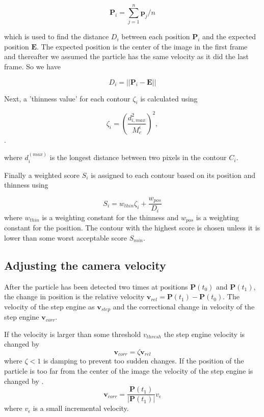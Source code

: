 \[
\mathbf{P}_i = \sum_{j=1}^n \mathbf{p}_j/n
\]

\noindent which is used to find the distance $D_i$ between each position $\mathbf{P}_i$ and the expected position $\mathbf{E}$. The expected position is the center of the image in the first frame and thereafter we assumed the particle has the same velocity as it did the last frame. So we have 

\[
D_i = \left|\left|\mathbf{P}_i - \mathbf{E}\right|\right|
\]

\noindent Next, a 'thinness value' for each contour $\zeta_i$ is calculated using

\begin{equation}\label{eq:thinness}
\zeta_i =  \left(\frac{d_{i, max}^2}{M_c^i}\right)^2,
\end{equation}. 

\noindent where $d_i^{(max)}$ is the longest distance between two pixels in the contour $C_i$.

Finally a weighted score $S_i$ is assigned to each contour based on its position and thinness using

\begin{equation}
S_i = w_{thin}\zeta_i + \frac{w_{pos}}{D_i}
\end{equation}
\noindent where $w_{thin}$ is a weighting constant for the thinness and $w_{pos}$ is a weighting constant for the position. The contour with the highest score is chosen unless it is lower than some worst acceptable score $S_{min}$. 

\subsection{Adjusting the camera velocity}
After the particle has been detected two times at positions $\mathbf{P}(t_0)$ and $\mathbf{P}(t_1)$, the change in position is the relative velocity $\mathbf{v}_{rel} = \mathbf{P}(t_1) - \mathbf{P}(t_0)$.  The velocity of the step engine as $\mathbf{v}_{step}$ and the correctional change in velocity of the step engine $\mathbf{v}_{corr}$.

If the velocity is larger than some threshold $v_{thresh}$ the step engine velocity is changed by
\[
\mathbf{v}_{corr} = \zeta\mathbf{v}_{rel}
\]
where $\zeta < 1$ is damping to prevent too sudden changes. If the position of the particle is too far from the center of the image the velocity of the step engine is changed by .
\[
\mathbf{v}_{corr} = \frac{\mathbf{P}(t_1)}{\left|\mathbf{P}(t_1)\right|}v_{\epsilon}
\] 
where $v_{\epsilon}$ is a small incremental velocity.


